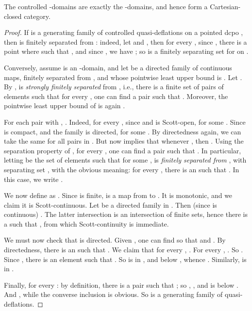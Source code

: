 \documentclass{LMCS}
\begin{document}
\begin{thm}
  \label{thm:ctrlQRB}
  The controlled -domains are exactly the -domains, and
  hence form a Cartesian-closed category.
\end{thm}
\begin{proof}
  If  is a generating family of
  controlled quasi-deflations on a pointed dcpo , then  is
  finitely separated from : indeed, let  and , then for every , since ,
  there is a point  where 
  such that , and since , we have ; so  is a finitely separating
  set for  on .

  Conversely, assume  is an -domain, and let  be a directed family of continuous maps, finitely separated
  from , and whose pointwise least upper bound is
  .  Let .  By
  \cite[Lemma~2]{Jung:CCC:LICS},  is {\em strongly finitely
    separated\/} from , i.e., there is a finite set 
  of pairs of elements  such that for every , one
  can find a pair  such that .  Moreover, the pointwise least upper bound of  is again .

  For each pair  with , .
  Indeed, for every , since  and  is Scott-open,  for
  some .  Since  is compact, and the family
   is directed,  for some .  By
  directedness again, we can take the same  for all pairs  in .  But now 
  implies that whenever , then .  Using the
  separation property of , for every , one can find a
  pair  such that .  In
  particular, letting  be the set of elements  such that  for some ,  is {\em finitely separated
    from \/}, with separating set , with the obvious
  meaning: for every , there is an  such that .  In this case, we write .

  We now define  as .
  Since  is finite,  is a map from  to .
  It is monotonic, and we claim it is Scott-continuous.  Let
   be a directed family in .  Then  (since  is continuous) .  The latter intersection is an intersection of finite sets,
  hence there is a  such that , from which Scott-continuity is
  immediate.

  We must now check that  is directed.  Given
  , one can find  so that  and .  By directedness, there is
  an  such that .  We claim that
  for every , .  For every , .  So .  Since , there
  is an element  such that .  So  is in , and below ,
  whence .  Similarly,  is in .

  Finally,  for every : by definition,
  there is a pair  such that ; so , , and  is below .
  And , while the
  converse inclusion is obvious.  So  is a
  generating family of quasi-deflations.
\end{proof}
\end{document}
